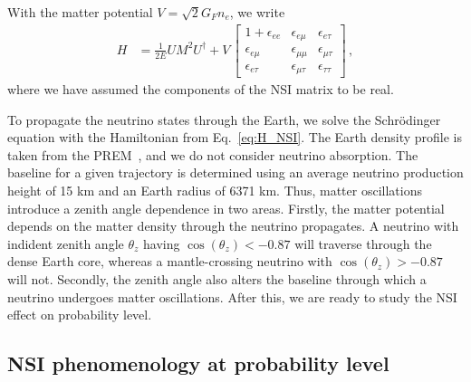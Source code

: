 \documentclass{revtex4-2}
\newcommand{\z}{\ensuremath{\cos{(\theta_z)}}}
\newcommand{\emt}{\ensuremath{\epsilon_{\mu\tau}}}
\newcommand{\eem}{\epsilon_{e\mu}}
\newcommand{\nm}{\nu_\mu}
\newcommand{\anm}{\bar\nu_\mu}
\newcommand{\Pmm}{P_{\mu\mu}}
\begin{document}
With the matter potential $V = \sqrt{2}G_F n_e$, we write
\begin{align} \label{eq:H_NSI}
   H &= \frac{1}{2E} UM^2U^\dagger + V\,
   \begin{bmatrix}      
      1 + \epsilon_{ee} & \epsilon_{e\mu} & \epsilon_{e\tau}  \\
      \epsilon_{e\mu} & \epsilon_{\mu\mu} & \epsilon_{\mu\tau}  \\
      \epsilon_{e \tau} & \epsilon_{\mu\tau} & \epsilon_{\tau\tau}
  \end{bmatrix}\,,
\end{align}
where we have assumed the components of the NSI matrix to be real. 

To propagate the neutrino states through the Earth, we solve the Schrödinger equation with the Hamiltonian from Eq.~\ref{eq:H_NSI}. 
The Earth density profile is taken from the PREM~\cite{PREM}, and we do not consider neutrino absorption.
The baseline for a given trajectory is determined using an average neutrino production height of 15 km and an Earth radius of 6371 km.
Thus, matter oscillations introduce a zenith angle dependence in two areas. Firstly, the matter potential depends on the matter density through the
neutrino propagates. A neutrino with indident zenith angle $\theta_z$ having $\z < -0.87$ will traverse through the dense Earth core, whereas a mantle-crossing neutrino 
with $\z > -0.87$ will not. Secondly, the zenith angle also alters the baseline through which a neutrino undergoes matter oscillations.
After this, we are ready to study the NSI effect on probability level.


\subsection{NSI phenomenology at probability level}\label{sec:nsiProbEffects}

\end{document}
